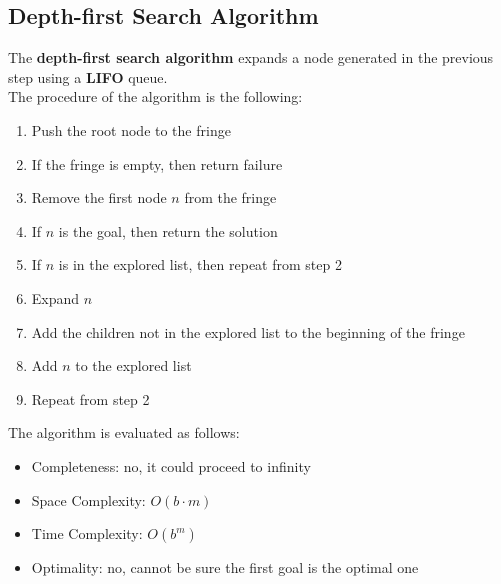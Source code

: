 \documentclass{article}
\begin{document}
\subsection{Depth-first Search Algorithm}
The \textbf{depth-first search algorithm} expands a node generated in the previous step using a \textbf{LIFO} queue. \\
The procedure of the algorithm is the following:
\begin{enumerate}
    \item Push the root node to the fringe
    \item If the fringe is empty, then return failure
    \item Remove the first node $n$ from the fringe
    \item If $n$ is the goal, then return the solution
    \item If $n$ is in the explored list, then repeat from step 2
    \item Expand $n$
    \item Add the children not in the explored list to the beginning of the fringe
    \item Add $n$ to the explored list
    \item Repeat from step 2
\end{enumerate}
The algorithm is evaluated as follows:
\begin{itemize}
    \item Completeness: no, it could proceed to infinity
    \item Space Complexity: $O(b \cdot m)$
    \item Time Complexity: $O(b^m)$
    \item Optimality: no, cannot be sure the first goal is the optimal one
\end{itemize}
\newpage
\end{document}
